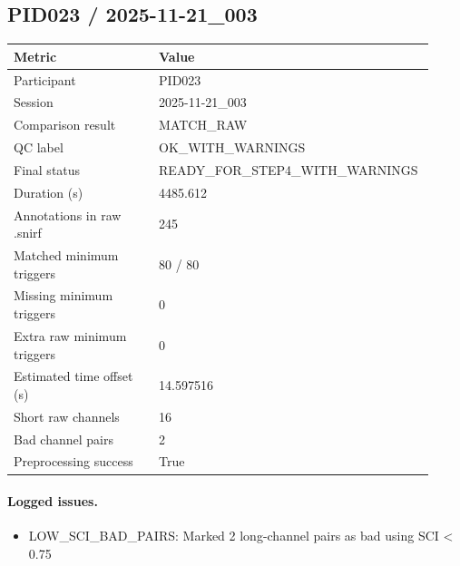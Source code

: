 \subsection*{PID023 / 2025-11-21\_003}
\begin{tabular}{p{0.34\linewidth}p{0.58\linewidth}}
\toprule
Metric & Value\\
\midrule
Participant & PID023\\
Session & 2025-11-21\_003\\
Comparison result & MATCH\_RAW\\
QC label & OK\_WITH\_WARNINGS\\
Final status & READY\_FOR\_STEP4\_WITH\_WARNINGS\\
Duration (s) & 4485.612\\
Annotations in raw .snirf & 245\\
Matched minimum triggers & 80 / 80\\
Missing minimum triggers & 0\\
Extra raw minimum triggers & 0\\
Estimated time offset (s) & 14.597516\\
Short raw channels & 16\\
Bad channel pairs & 2\\
Preprocessing success & True\\
\bottomrule
\end{tabular}
\paragraph{Logged issues.}
\begin{itemize}
\item [WARNING] LOW\_SCI\_BAD\_PAIRS: Marked 2 long-channel pairs as bad using SCI < 0.75
\end{itemize}
